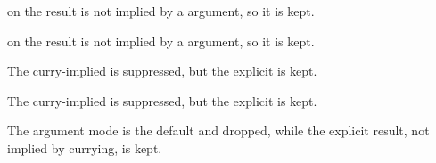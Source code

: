 \label{Oxcaml--val-keep_portable}\begin{ocamlindent} on the result is not implied by a  argument, so it is kept.\end{ocamlindent}%
\medbreak
\label{Oxcaml--val-keep_once}\begin{ocamlindent} on the result is not implied by a  argument, so it is kept.\end{ocamlindent}%
\medbreak
\label{Oxcaml--val-keep_over_once}\begin{ocamlindent}The curry-implied  is suppressed, but the explicit  is kept.\end{ocamlindent}%
\medbreak
\label{Oxcaml--val-keep_over_local}\begin{ocamlindent}The curry-implied  is suppressed, but the explicit  is kept.\end{ocamlindent}%
\medbreak
\label{Oxcaml--val-keep_portable_over_nonportable}\begin{ocamlindent}The  argument mode is the default and dropped, while the explicit  result, not implied by currying, is kept.\end{ocamlindent}%
\medbreak
